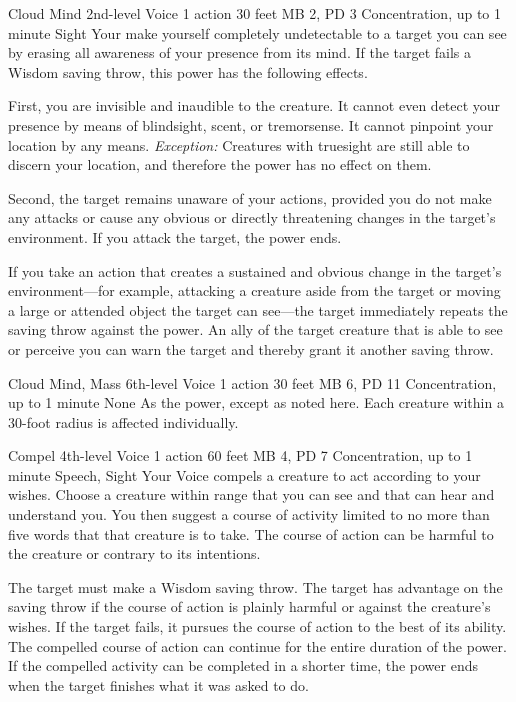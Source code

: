 \DndPowerHeader%
    {Cloud Mind\label{pwr:cloud_mind}}
    {2nd-level Voice}
    {1 action}
    {30 feet}
    {MB 2, PD 3}
    {Concentration, up to 1 minute}
    {Sight}
Your make yourself completely undetectable
to a target you can see by erasing all awareness of your presence
from its mind. If the target fails a Wisdom saving throw,
this power has the following effects.

First, you are invisible and inaudible to the creature. It
cannot even detect your presence by means of blindsight, scent,
or tremorsense. It cannot pinpoint your location by any means.
\textit{Exception:} Creatures with truesight are still able
to discern your location, and therefore the power has no effect
on them.

Second, the target remains unaware of your actions, provided
you do not make any attacks or cause any obvious or directly
threatening changes in the target's environment. If you
attack the target, the power ends.

If you take an action that creates a sustained and obvious
change in the target's environment---for example, attacking
a creature aside from the target or moving a large or attended
object the target can see---the target immediately repeats
the saving throw against the power. An ally of the target
creature that is able to see or perceive you can warn the
target and thereby grant it another saving throw.

\DndPowerHeader%
    {Cloud Mind, Mass\label{pwr:cloud_mind_mass}}
    {6th-level Voice}
    {1 action}
    {30 feet}
    {MB 6, PD 11}
    {Concentration, up to 1 minute}
    {None}
As the  power, except as
noted here. Each creature within a 30-foot radius is affected
individually.

\DndPowerHeader%
    {Compel\label{pwr:compel}}
    {4th-level Voice}
    {1 action}
    {60 feet}
    {MB 4, PD 7}
    {Concentration, up to 1 minute}
    {Speech, Sight}
Your Voice compels a creature to act according
to your wishes. Choose a creature within range that you can see
and that can hear and understand you.
You then suggest a course of activity
limited to no more than five words that that creature is to
take. The course of action can be harmful to the creature
or contrary to its intentions.

The target must make a Wisdom saving throw. The target has
advantage on the saving throw if the course of action is plainly
harmful or against the creature's wishes. If the target fails,
it pursues the course of action to the best of its ability.
The compelled course of action can continue for the entire
duration of the power. If the compelled activity can be completed
in a shorter time, the power ends when the target finishes
what it was asked to do.

